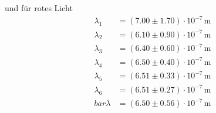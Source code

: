 und für rotes Licht
\begin{align*}
    \lambda_1& =(7.00\pm 1.70)\cdot 10^{-7}\,\unit{\meter}\\
    \lambda_2& =(6.10\pm 0.90)\cdot 10^{-7}\,\unit{\meter}\\
    \lambda_3& =(6.40\pm 0.60)\cdot 10^{-7}\,\unit{\meter}\\
    \lambda_4& =(6.50\pm 0.40)\cdot 10^{-7}\,\unit{\meter}\\
    \lambda_5& =(6.51\pm 0.33)\cdot 10^{-7}\,\unit{\meter}\\
    \lambda_6& =(6.51\pm 0.27)\cdot 10^{-7}\,\unit{\meter}\\
    bar{\lambda}&=(6.50\pm 0.56)\cdot 10^{-7}\,\unit{\meter}
\end{align*}
